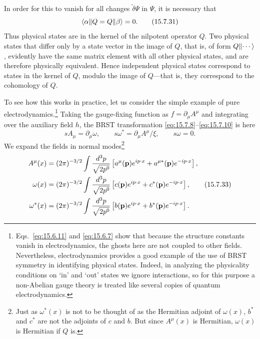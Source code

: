 In order for this to vanish for all changes $\widetilde\delta\Psi$ in $\Psi$, it is necessary that
\begin{equation}
 \langle\alpha\|Q=Q\lVert \beta\rangle=0.
 \tag{15.7.31}\label{eq:15.7.31}
\end{equation}
Thus physical states are in the kernel of the nilpotent operator $Q$. Two physical states that differ only by a state vector in the image of $Q$, that is, of form $Q\lVert \cdots\rangle$, evidently have the same matrix element with all other physical states, and are therefore physically equivalent. Hence independent physical states correspond to states in the kernel of $Q$, modulo the image of $Q$---that is, they correspond to the cohomology of $Q$.

To see how this works in practice, let us consider the simple example of pure electrodynamics.\footnote{Eqs.~\eqref{eq:15.6.11} and \eqref{eq:15.6.7} show that because the structure constants vanish in electrodynamics, the ghosts here are not coupled to other fields. Nevertheless, electrodynamics provides a good example of the use of BRST symmetry in identifying physical states. Indeed, in analyzing the physicality conditions on `in' and `out' states we ignore interactions, so for this purpose a non-Abelian gauge theory is treated like several copies of quantum electrodynamics.} Taking the gauge-fixing function as $f=\partial_\mu A^\mu$ and integrating over the auxiliary field $h$, the BRST transformation \eqref{eq:15.7.8}--\eqref{eq:15.7.10} is here
\begin{equation}
 sA_\mu=\partial_\mu\omega,
 \qquad s\omega^*=\partial_\mu A^\mu/\xi,
 \qquad s\omega=0.
 \tag{15.7.32}\label{eq:15.7.32}
\end{equation}
We expand the fields in normal modes\footnote{Just as $\omega^*(x)$ is not to be thought of as the Hermitian adjoint of $\omega(x)$, $b^*$ and $c^*$ are not the adjoints of $c$ and $b$. But since $A^\mu(x)$ is Hermitian, $\omega(x)$ is Hermitian if $Q$ is.}
\begin{align}
 A^\mu(x)&=(2\pi)^{-3/2}\int\frac{d^3p}{\sqrt{2p^0}}
 \left[a^\mu(\mathbf p)e^{ip\cdot x}+a^{\mu*}(\mathbf p)e^{-ip\cdot x}\right],\notag\\
 \omega(x)&=(2\pi)^{-3/2}\int\frac{d^3p}{\sqrt{2p^0}}
 \left[c(\mathbf p)e^{ip\cdot x}+c^*(\mathbf p)e^{-ip\cdot x}\right],\tag{15.7.33}\label{eq:15.7.33}\\
 \omega^*(x)&=(2\pi)^{-3/2}\int\frac{d^3p}{\sqrt{2p^0}}
 \left[b(\mathbf p)e^{ip\cdot x}+b^*(\mathbf p)e^{-ip\cdot x}\right].\notag
\end{align}
